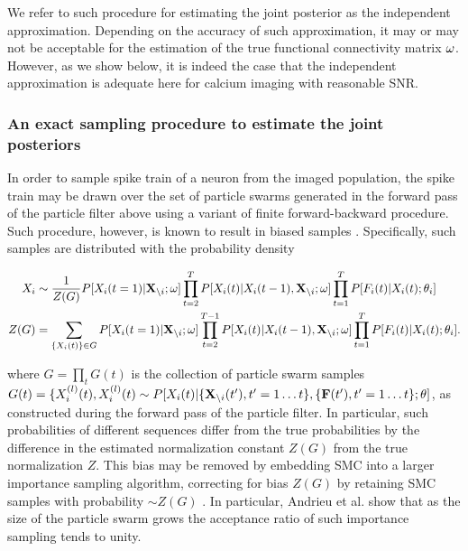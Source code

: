 %

We refer to such procedure for estimating the joint posterior as the independent approximation. Depending on the accuracy of such approximation, it may or may not be acceptable for the estimation of the true functional connectivity matrix $\mathbf{\omega}$. However, as we show below, it is indeed the case that the independent approximation is adequate here for calcium imaging with reasonable SNR.

\subsubsection{An exact sampling procedure to estimate the joint posteriors}

In order to sample spike train of a neuron from the imaged population, the spike train may be drawn over the set of particle swarms generated in the forward pass of the particle filter above using a variant of finite forward-backward procedure.  Such procedure, however, is known to result in biased samples \cite{Andrieu2007, NBR03}.
Specifically, such samples are distributed with the probability density

\begin{align}
X_i &\sim \frac{1}{Z(G)} P[X_i(t=1)|{\bf X}_{\backslash i}; \mathbf{\omega}]\prod\limits_{t=2}^{T}P[X_i(t)|X_i(t-1), {\bf X}_{\backslash i}; \mathbf{\omega}] \prod_{t=1}^{T} P[F_i(t)|X_i(t); \mathbf{\theta}_i] \\
Z(G) &= \sum_{\{X_i(t)\}\in G} P[X_i(t=1)|{\bf X}_{\backslash i}; \mathbf{\omega}] \prod_{t=2}^{T-1}P[X_i(t)|X_i(t-1), {\bf X}_{\backslash i}; \mathbf{\omega}] \prod_{t=1}^{T}P[F_i(t)|X_i(t); \mathbf{\theta}_i].
\end{align}

\noindent where $G=\prod\limits_t G(t)$ is the collection of particle swarm samples $G(t)=\{X_i^{(l)}(t), X_i^{(l)}(t) \sim P[X_i(t)|\{{\bf X}_{\backslash i}(t'),t'=1\ldots t\},\{{\bf F}(t'),t'=1\ldots t\};\theta]$, as constructed during the forward pass of the particle filter.  In particular, such probabilities of different sequences differ from the true probabilities by the difference in the estimated normalization constant $Z(G)$ from the true normalization $Z$.  This bias may be removed by embedding SMC into a larger importance sampling algorithm, correcting for bias $Z(G)$ by retaining SMC samples with probability $\sim Z(G)$ \cite{Andrieu2007}. In particular, Andrieu et al. \cite{Andrieu2007} show that as the size of the particle swarm grows the acceptance ratio of such importance sampling tends to unity.

